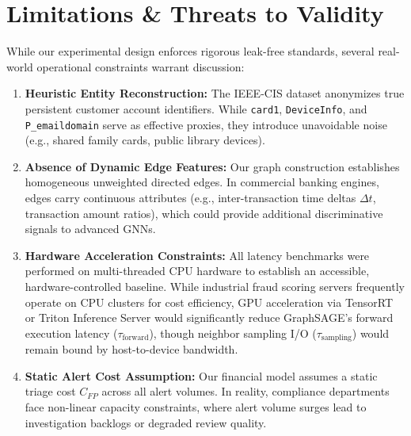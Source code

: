 \documentclass[11pt,a4paper]{report}
\begin{document}
\section{Limitations \& Threats to Validity}
While our experimental design enforces rigorous leak-free standards, several real-world operational constraints warrant discussion:
\begin{enumerate}
    \item \textbf{Heuristic Entity Reconstruction:} The IEEE-CIS dataset anonymizes true persistent customer account identifiers. While \texttt{card1}, \texttt{DeviceInfo}, and \texttt{P\_emaildomain} serve as effective proxies, they introduce unavoidable noise (e.g., shared family cards, public library devices).
    \item \textbf{Absence of Dynamic Edge Features:} Our graph construction establishes homogeneous unweighted directed edges. In commercial banking engines, edges carry continuous attributes (e.g., inter-transaction time deltas $\Delta t$, transaction amount ratios), which could provide additional discriminative signals to advanced GNNs.
    \item \textbf{Hardware Acceleration Constraints:} All latency benchmarks were performed on multi-threaded CPU hardware to establish an accessible, hardware-controlled baseline. While industrial fraud scoring servers frequently operate on CPU clusters for cost efficiency, GPU acceleration via TensorRT or Triton Inference Server would significantly reduce GraphSAGE's forward execution latency ($\tau_{\text{forward}}$), though neighbor sampling I/O ($\tau_{\text{sampling}}$) would remain bound by host-to-device bandwidth.
    \item \textbf{Static Alert Cost Assumption:} Our financial model assumes a static triage cost $C_{FP}$ across all alert volumes. In reality, compliance departments face non-linear capacity constraints, where alert volume surges lead to investigation backlogs or degraded review quality.
\end{enumerate}
\end{document}
